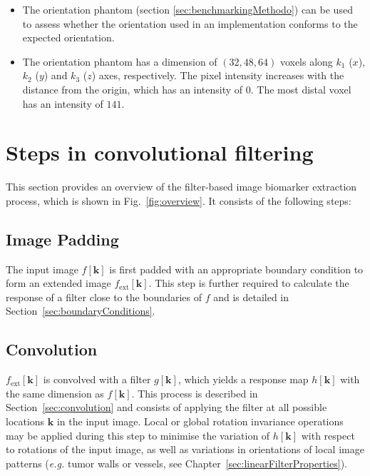 \documentclass[fleqn,a4paper,oneside,openany]{book}
\begin{document}
\vspace{2mm}
\begin{tcolorbox}[width=150mm, halign=left, colframe=black, colback=white, boxsep=0mm, arc=3mm, colframe=black!50!white,
title=Implementation Troubleshooting, title filled=true, fonttitle=\bfseries]
\begin{itemize}
\item The orientation phantom (section \ref{sec:benchmarkingMethodo}) can be used to assess whether the orientation used in an implementation conforms to the expected orientation.
\item The orientation phantom has a dimension of $(32, 48, 64)$ voxels along $k_1$ ($x$), $k_2$ ($y$) and $k_3$ ($z$) axes, respectively. The pixel intensity increases with the distance from the origin, which has an intensity of $0$. The most distal voxel has an intensity of $141$.
\end{itemize}
\end{tcolorbox}

%
\section{Steps in convolutional filtering}\label{sec:overview}
%
This section provides an overview of the filter-based image biomarker extraction process, which is shown in Fig.~\ref{fig:overview}.
It consists of the following steps:
%
\subsection{Image Padding}
%
The input image $f[\boldsymbol{k}]$ is first padded with an appropriate boundary condition to form an extended image $f_{\text{ext}}[\boldsymbol{k}]$. This step is further required to calculate the response of a filter close to the boundaries of $f$ and is detailed in Section~\ref{sec:boundaryConditions}.
%
\subsection{Convolution}
%
$f_{\text{ext}}[\boldsymbol{k}]$ is convolved with a filter $g[\boldsymbol{k}]$, which yields a response map $h[\boldsymbol{k}]$ with the same dimension as $f[\boldsymbol{k}]$.
This process is described in Section~\ref{sec:convolution} and consists of applying the filter at all possible locations $\boldsymbol{k}$ in the input image.
Local or global rotation invariance operations may be applied during this step to minimise the variation of  $h[\boldsymbol{k}]$ with respect to rotations of the input image, as well as variations in orientations of local image patterns (\textit{e.g.} tumor walls or vessels, see Chapter~\ref{sec:linearFilterProperties}).
%
\end{document}
